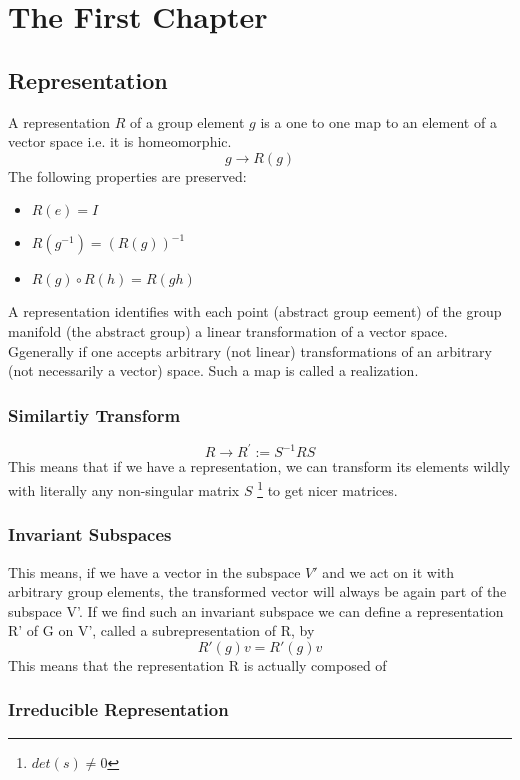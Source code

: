 \chapter{The First Chapter}
\section{Representation}
A representation $R$ of a group element $g$ is a one to one map to an element of a vector space i.e. it is homeomorphic.
$$g \rightarrow R(g)$$
The following properties are preserved:
\begin{itemize}
\item $R(e) = I$
\item $R(g^{-1}) = (R(g))^{-1}$
\item $R(g) \circ R(h) = R(gh)$
\end{itemize}
A representation identifies with each point (abstract group eement) of the group manifold (the abstract group) a linear transformation of a vector space. Ggenerally if one accepts arbitrary (not linear) transformations of an arbitrary
(not necessarily a vector) space. Such a map is called a realization. 
\subsection{Similartiy Transform}
$$R \rightarrow R^{'} := S^{-1}RS$$
This means that if we have a representation, we can transform its elements wildly with literally any non-singular matrix $S$ \footnote{$det(s) \neq 0$} to get nicer matrices.
\subsection{Invariant Subspaces}
This means, if we have a vector in the subspace $V'$ and we act on it with arbitrary group elements, the transformed
vector will always be again part of the subspace V'. If we find such an invariant subspace we can define a representation R' of G on V', called a subrepresentation of R, by
$$R'(g)v = R'(g)v$$
This means that the representation R is actually composed of 
\subsection{Irreducible Representation}

